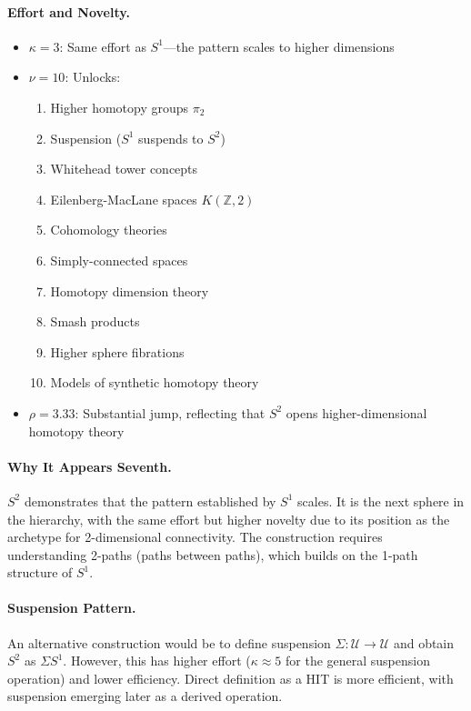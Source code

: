 \documentclass[11pt]{article}
\theoremstyle{definition}
\begin{document}
\paragraph{Effort and Novelty.}
\begin{itemize}
\item $\kappa = 3$: Same effort as $S^1$—the pattern scales to higher dimensions
\item $\nu = 10$: Unlocks:
\begin{enumerate}
\item Higher homotopy groups $\pi_2$
\item Suspension ($S^1$ suspends to $S^2$)
\item Whitehead tower concepts
\item Eilenberg-MacLane spaces $K(\mathbb{Z}, 2)$
\item Cohomology theories
\item Simply-connected spaces
\item Homotopy dimension theory
\item Smash products
\item Higher sphere fibrations
\item Models of synthetic homotopy theory
\end{enumerate}
\item $\rho = 3.33$: Substantial jump, reflecting that $S^2$ opens higher-dimensional homotopy theory
\end{itemize}

\paragraph{Why It Appears Seventh.}
$S^2$ demonstrates that the pattern established by $S^1$ scales. It is the next sphere in the hierarchy, with the same effort but higher novelty due to its position as the archetype for 2-dimensional connectivity. The construction requires understanding 2-paths (paths between paths), which builds on the 1-path structure of $S^1$.

\paragraph{Suspension Pattern.}
An alternative construction would be to define suspension $\Sigma : \mathcal{U} \to \mathcal{U}$ and obtain $S^2$ as $\Sigma S^1$. However, this has higher effort ($\kappa \approx 5$ for the general suspension operation) and lower efficiency. Direct definition as a HIT is more efficient, with suspension emerging later as a derived operation.
\end{document}
